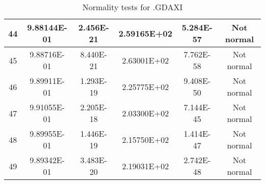 \begin{table}[h]
\begin{tabular}{|c|c|c|c|c|c|}
		44 & 9.88144E-01 & 2.456E-21 & 2.59165E+02 & 5.284E-57 & Not normal\\\hline
		45 & 9.88716E-01 & 8.440E-21 & 2.63001E+02 & 7.762E-58 & Not normal\\\hline
		46 & 9.89911E-01 & 1.293E-19 & 2.25775E+02 & 9.408E-50 & Not normal\\\hline
		47 & 9.91055E-01 & 2.205E-18 & 2.03300E+02 & 7.144E-45 & Not normal\\\hline
		48 & 9.89955E-01 & 1.446E-19 & 2.15750E+02 & 1.414E-47 & Not normal\\\hline
		49 & 9.89342E-01 & 3.483E-20 & 2.19031E+02 & 2.742E-48 & Not normal\\\hline
	\end{tabular}
	\caption{Normality tests for .GDAXI}
	\label{tab:normality_tests_GDAXI}
\end{table}
